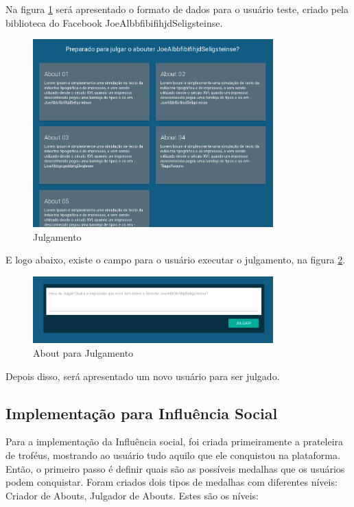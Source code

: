 Na figura \ref{fig:julgamento} será apresentado o formato de dados para o usuário teste,
criado pela biblioteca do Facebook JoeAlbbfibifihjdSeligsteinse.

\begin{figure}[h]
    \centering
    \includegraphics[width=350px, scale=1]{figuras/julgamento}
    \caption{Julgamento}
    \label{fig:julgamento}
\end{figure}

E logo abaixo, existe o campo para o usuário executar o julgamento, na figura \ref{fig:julgamento_about}.

\begin{figure}[h]
    \centering
    \includegraphics[width=350px, scale=1]{figuras/julgamento_about}
    \caption{About para Julgamento}
    \label{fig:julgamento_about}
\end{figure}

Depois disso, será apresentado um novo usuário para ser julgado.

\subsection{Implementação para Influência Social}
\label{sub:implementacao_influencia_social}
Para a implementação da Influência social, foi criada primeiramente a prateleira de troféus, mostrando
ao usuário tudo aquilo que ele conquistou na plataforma. Então, o primeiro passo é definir quais são
as possíveis medalhas que os usuários podem conquistar. Foram criados dois tipos de medalhas com diferentes
níveis: Criador de Abouts, Julgador de Abouts. Estes são os níveis:

